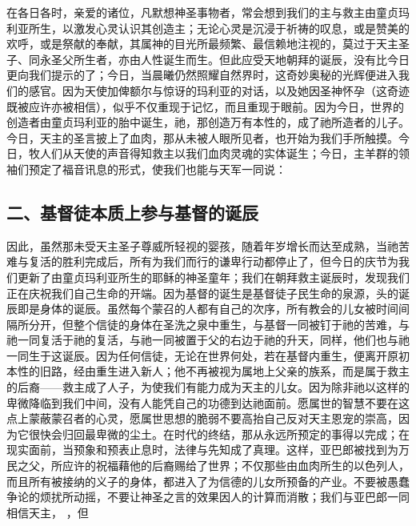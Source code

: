 在各日各时，亲爱的诸位，凡默想神圣事物者，常会想到我们的主与救主由童贞玛利亚所生，以激发心灵认识其创造主；无论心灵是沉浸于祈祷的叹息，或是赞美的欢呼，或是祭献的奉献，其属神的目光所最频繁、最信赖地注视的，莫过于天主圣子、同永圣父所生者，亦由人性诞生而生。但此应受天地朝拜的诞辰，没有比今日更向我们提示的了；今日，当晨曦仍然照耀自然界时，这奇妙奥秘的光辉便进入我们的感官。因为天使加俾额尔与惊讶的玛利亚的对话，以及她因圣神怀孕（这奇迹既被应许亦被相信），似乎不仅重现于记忆，而且重现于眼前。因为今日，世界的创造者由童贞玛利亚的胎中诞生，祂，那创造万有本性的，成了祂所造者的儿子。今日，天主的圣言披上了血肉，那从未被人眼所见者，也开始为我们手所触摸。今日，牧人们从天使的声音得知救主以我们血肉灵魂的实体诞生；今日，主羊群的领袖们预定了福音讯息的形式，使我们也能与天军一同说：\par


\subsection{二、基督徒本质上参与基督的诞辰}

因此，虽然那未受天主圣子尊威所轻视的婴孩，随着年岁增长而达至成熟，当祂苦难与复活的胜利完成后，所有为我们而行的谦卑行动都停止了，但今日的庆节为我们更新了由童贞玛利亚所生的耶稣的神圣童年；我们在朝拜救主诞辰时，发现我们正在庆祝我们自己生命的开端。因为基督的诞生是基督徒子民生命的泉源，头的诞辰即是身体的诞辰。虽然每个蒙召的人都有自己的次序，所有教会的儿女被时间间隔所分开，但整个信徒的身体在圣洗之泉中重生，与基督一同被钉于祂的苦难，与祂一同复活于祂的复活，与祂一同被置于父的右边于祂的升天，同样，他们也与祂一同生于这诞辰。因为任何信徒，无论在世界何处，若在基督内重生，便离开原初本性的旧路，经由重生进入新人；他不再被视为属地上父亲的族系，而是属于救主的后裔——救主成了人子，为使我们有能力成为天主的儿女。因为除非祂以这样的卑微降临到我们中间，没有人能凭自己的功德到达祂面前。愿属世的智慧不要在这点上蒙蔽蒙召者的心灵，愿属世思想的脆弱不要高抬自己反对天主恩宠的崇高，因为它很快会归回最卑微的尘土。在时代的终结，那从永远所预定的事得以完成；在现实面前，当预象和预表止息时，法律与先知成了真理。这样，亚巴郎被找到为万民之父，所应许的祝福藉他的后裔赐给了世界；不仅那些由血肉所生的以色列人，而且所有被接纳的义子的身体，都进入了为信德的儿女所预备的产业。不要被愚蠢争论的烦扰所动摇，不要让神圣之言的效果因人的计算而消散；我们与亚巴郎一同相信天主， ，但\par

